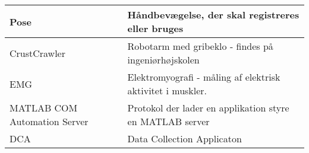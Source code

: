 \begin{tabular}{p{90pt}p{240pt}}
	Pose & Håndbevægelse, der skal registreres eller bruges\\ \hline
	CrustCrawler & Robotarm med gribeklo - findes på ingeniørhøjskolen\\ \hline
	EMG & Elektromyografi - måling af elektrisk aktivitet i muskler.\\ \hline
	MATLAB COM Automation Server & Protokol der lader en applikation styre en MATLAB server\citep{RefWorks:5}\\ \hline
	DCA & Data Collection Applicaton\\
\end{tabular}